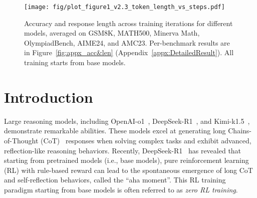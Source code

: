 \begin{figure}[htbp]
\vspace{-10pt}
        \centering
\texttt{[image: fig/plot\_figure1\_v2.3\_token\_length\_vs\_steps.pdf]}
\vspace{-10pt}
\caption{Accuracy and response length across training iterations for different models, averaged on GSM8K, MATH500, Minerva Math, OlympiadBench, AIME24, and AMC23. Per-benchmark results are in Figure~\ref{fig:appx_acc&len} (Appendix~\ref{appx:DetailedResult}). All training starts from base models.
        }
        \label{fig1:acc&len}
    \vspace{-10pt}
\end{figure}


\section{Introduction}
Large reasoning models, including OpenAI-o1~\citep{jaech2024openai}, DeepSeek-R1~\citep{guo2025deepseek}, and Kimi-k1.5~\citep{team2025kimi}, demonstrate remarkable abilities. These models excel at generating long Chains-of-Thought (CoT)~\citep{wei2022chain} responses when solving complex tasks and exhibit advanced, reflection-like reasoning behaviors. 
Recently, DeepSeek-R1~\citep{guo2025deepseek} has revealed that starting from pretrained models (i.e., base models), pure reinforcement learning (RL) with rule-based reward can lead to the spontaneous emergence of long CoT and self-reflection behaviors, called the ``aha moment''. This RL training paradigm starting from base models is often referred to as \emph{zero RL training}.

